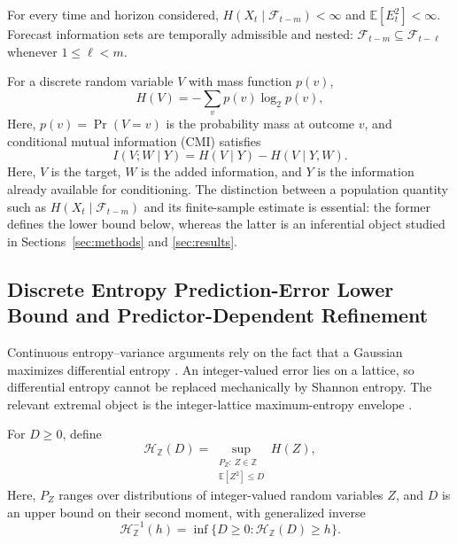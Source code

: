 \documentclass[applsci,article,accept,moreauthors]{Definitions/mdpi}
\def\hl#1{#1}%
\begin{document}
\begin{Assumption}
\label{ass:general_regularity}
For every time and horizon considered,
\(H(X_t\mid\mathcal{F}_{t-m})<\infty\) and
\(\mathbb{E}[E_t^2]<\infty\). Forecast information sets are temporally admissible and
nested:
\(\mathcal{F}_{t-m}\subseteq\mathcal{F}_{t-\ell}\) whenever
\(1\leq\ell<m\).
\end{Assumption}

For a discrete random variable \(V\) with mass function \(p(v)\),
\begin{equation}
H(V)=-\sum_vp(v)\log_2p(v),
\label{eq:shannon_entropy}
\end{equation}
{\hl{Here}, \(p(v)=\Pr(V=v)\) is the probability mass at outcome \(v\),}
and conditional mutual information (CMI) satisfies
\begin{equation}
I(V;W\mid Y)=H(V\mid Y)-H(V\mid Y,W).
\label{eq:cmi_definition}
\end{equation}
{\hl{Here}, \(V\) is the target, \(W\) is the added information, and \(Y\) is
the information already available for conditioning.}
The distinction between a population quantity such as
\(H(X_t\mid\mathcal F_{t-m})\) and its finite-sample estimate is essential:
the former defines the lower bound below, whereas the latter is an inferential
object studied in Sections~\ref{sec:methods} and \ref{sec:results}.

\subsection{Discrete Entropy Prediction-Error Lower Bound and Predictor-Dependent Refinement}
\label{subsec:discrete_bound}

Continuous entropy--variance arguments rely on the fact that a Gaussian
maximizes differential entropy \citep{fang_variance_bounds}. An
integer-valued error lies on a lattice, so differential entropy cannot be
replaced mechanically by Shannon entropy. The relevant extremal object is
the integer-lattice maximum-entropy envelope
\citep{massey_integer_entropy}.

\begin{Definition}
\label{def:integer_entropy_envelope}
For \(D\geq0\), define
\begin{equation}
\mathcal H_{\mathbb Z}(D)
=
\sup_{\substack{P_Z:\,Z\in\mathbb Z\\\mathbb E[Z^2]\leq D}}H(Z),
\label{eq:integer_entropy_envelope}
\end{equation}
{Here, \(P_Z\) ranges over distributions of integer-valued random
variables \(Z\), and \(D\) is an upper bound on their second moment,}
with generalized inverse
\begin{equation}
\mathcal H_{\mathbb Z}^{-1}(h)
=
\inf\{D\geq0:\mathcal H_{\mathbb Z}(D)\geq h\}.
\label{eq:integer_entropy_inverse}
\end{equation}
\end{Definition}
\end{document}
